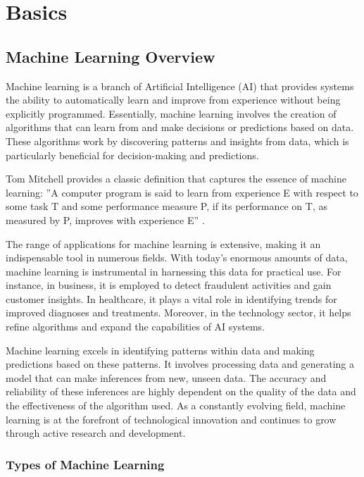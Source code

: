 \chapter{Basics}
\label{sec:basics}

\section{Machine Learning Overview}

Machine learning is a branch of Artificial Intelligence (AI) that provides systems the ability to automatically learn and improve from experience without being explicitly programmed. Essentially, machine learning involves the creation of algorithms that can learn from and make decisions or predictions based on data. These algorithms work by discovering patterns and insights from data, which is particularly beneficial for decision-making and predictions.

Tom Mitchell provides a classic definition that captures the essence of machine learning: ''A computer program is said to learn from experience E with respect to some task T and some performance measure P, if its performance on T, as measured by P, improves with experience E'' \cite[p. 2]{mitchell1997machine}.

The range of applications for machine learning is extensive, making it an indispensable tool in numerous fields. With today's enormous amounts of data, machine learning is instrumental in harnessing this data for practical use. For instance, in business, it is employed to detect fraudulent activities and gain customer insights. In healthcare, it plays a vital role in identifying trends for improved diagnoses and treatments. Moreover, in the technology sector, it helps refine algorithms and expand the capabilities of AI systems.

Machine learning excels in identifying patterns within data and making predictions based on these patterns. It involves processing data and generating a model that can make inferences from new, unseen data. The accuracy and reliability of these inferences are highly dependent on the quality of the data and the effectiveness of the algorithm used. As a constantly evolving field, machine learning is at the forefront of technological innovation and continues to grow through active research and development.


\subsection{Types of Machine Learning}

